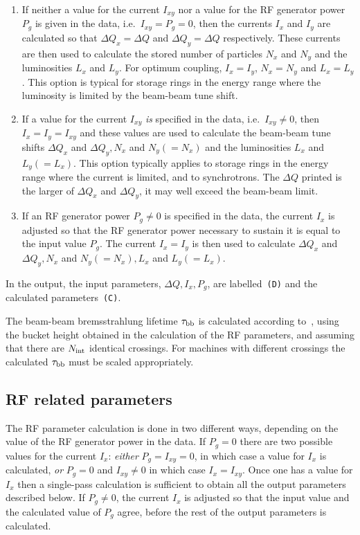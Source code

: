 \begin{enumerate}
 
\item If neither a value for the current \(I_{xy}\) nor a value for the
RF generator power \(P_g\) is given in the data, i.e.\ \(I_{xy} =P_g =0\),
then the currents \(I_x\) and \(I_y\) are calculated so that
\(\Delta Q_x=\Delta Q\) and \(\Delta Q_y=\Delta Q\) respectively.
These currents are then used to calculate the stored number of particles
\(N_x\) and \(N_y\) and the luminosities \(L_x\) and \(L_y\).  For optimum
coupling, \(I_x = I_y\), \(N_x = N_y \) and \(L_x=L_y\).  This option is
typical for storage rings in the energy range where the luminosity is
limited by the beam-beam tune shift.
 
\item If a value for the current \(I_{xy}\) {\sl is\/} specified in the
data, i.e.\ \(I_{xy} \neq 0\), then \(I_x=I_y=I_{xy}\) and these values
are used to calculate the beam-beam tune shifts \(\Delta Q_x\) and
\(\Delta Q_y, N_x\) and \(N_y (=N_x)\) and the luminosities \(L_x\)
and \(L_y (=L_x)\).
This option typically applies to storage rings in the energy
range where the current is limited, and to synchrotrons. The \(\Delta
Q\) printed is the larger of \(\Delta Q_x\) and \(\Delta Q_y\), it may well
exceed the beam-beam limit.
 
\item If an RF generator power \(P_g \neq 0\) is specified in the data,
the current \(I_x\) is adjusted so that the RF generator power necessary
to sustain it is equal to the input value \(P_g\). The current \(I_x=I_y\)
is then used to calculate \(\Delta Q_x\) and \(\Delta Q_y, N_x\) and \(N_y
(=N_x), L_x\) and \(L_y(=L_x)\).
 
\end{enumerate}
 
In the output, the input parameters, \(\Delta Q, I_x, P_g\),
are labelled~{\tt (D)} and the calculated parameters~{\tt (C)}.
 
The beam-beam bremsstrahlung lifetime \(\tau_{\rm bb}\) is calculated
according to~\cite{B-WM}, using the bucket height obtained in the
calculation of the RF parameters, and assuming that there are \(N_{\rm
int}\) identical crossings. For machines with different crossings the
calculated \(\tau_{\rm bb}\) must be scaled appropriately.
 
\subsection{RF related parameters}
The RF parameter calculation is done in two different ways, depending
on the value of the RF generator power in the data. If \(P_g=0\) there
are two possible values for the current \(I_x\): {\sl either\/} \(P_g =
I_{xy} = 0\), in which case a value for \(I_x\) is calculated, {\sl or\/}
\(P_g = 0\) and \(I_{xy} \neq 0\) in which case \(I_x=I_{xy}\). Once one has
a value for \(I_x\) then a single-pass calculation is sufficient to
obtain all the output parameters described below. If \(P_g \neq 0\), the
current \(I_x\) is adjusted so that the input value and the calculated
value of \(P_g\) agree, before the rest of the output parameters is
calculated.
 
